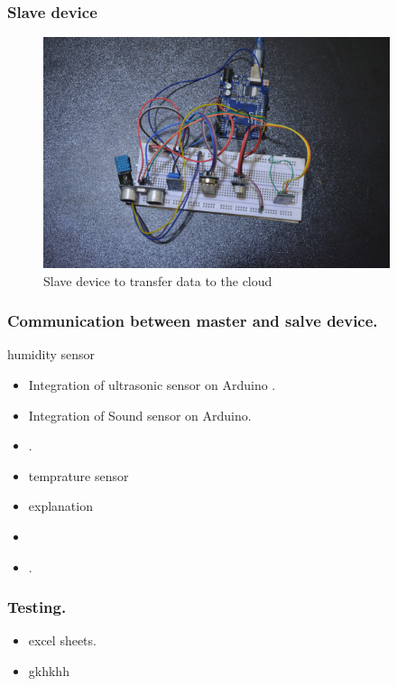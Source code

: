 \documentclass{beamer}
\begin{document}
\begin{frame}\frametitle{Slave  device}
\begin{itemize}
  \begin{figure}[H]
  \centerline{\includegraphics[width=4.0in]{slave1.JPG}}
  \caption{ \textbf{}Slave device to transfer data to the cloud}
  \end{figure}
\end{itemize}
\end{frame}
\begin{frame}\frametitle{Communication between master and salve device.}
 \item humidity sensor 
\begin{itemize}
\item Integration of ultrasonic sensor on Arduino .
\item Integration of Sound sensor on Arduino.
\item .
\item temprature sensor 
\item explanation
\item 
\item
.

\end{itemize}
\end{frame}
\begin{frame}\frametitle{Testing.}
\begin{itemize}
\item excel sheets.
\item gkhkhh 
\end{itemize}
\end{frame}
\end{document}
